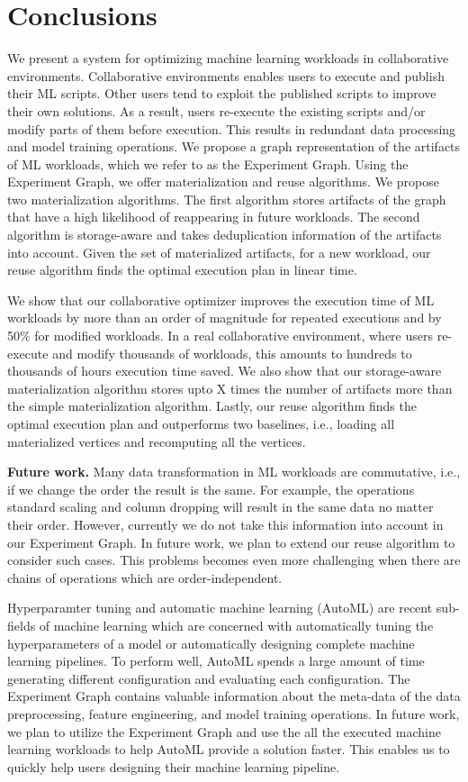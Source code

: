 \section{Conclusions} \label{sec-conclusion}
We present a system for optimizing machine learning workloads in collaborative environments.
Collaborative environments enables users to execute and publish their ML scripts.
Other users tend to exploit the published scripts to improve their own solutions.
As a result, users re-execute the existing scripts and/or modify parts of them before execution.
This results in redundant data processing and model training operations.
We propose a graph representation of the artifacts of ML workloads, which we refer to as the Experiment Graph.
Using the Experiment Graph, we offer materialization and reuse algorithms.
We propose two materialization algorithms.
The first algorithm stores artifacts of the graph that have a high likelihood of reappearing in future workloads.
The second algorithm is storage-aware and takes deduplication information of the artifacts into account.
Given the set of materialized artifacts, for a new workload, our reuse algorithm finds the optimal execution plan in linear time.

We show that our collaborative optimizer improves the execution time of ML workloads by more than an order of magnitude for repeated executions and by 50\% for modified workloads.
In a real collaborative environment, where users re-execute and modify thousands of workloads, this amounts to hundreds to thousands of hours execution time saved.
We also show that our storage-aware materialization algorithm stores upto X times the number of artifacts more than the simple materialization algorithm.
Lastly, our reuse algorithm finds the optimal execution plan and outperforms two baselines, i.e., loading all materialized vertices and recomputing all the vertices.

\textbf{Future work.}
Many data transformation in ML workloads are commutative, i.e., if we change the order the result is the same.
For example, the operations standard scaling and column dropping will result in the same data no matter their order.
However, currently we do not take this information into account in our Experiment Graph.
In future work, we plan to extend our reuse algorithm to consider such cases.
This problems becomes even more challenging when there are chains of operations which are order-independent.

Hyperparamter tuning and automatic machine learning (AutoML) are recent sub-fields of machine learning which are concerned with automatically tuning the hyperparameters of a model or automatically designing complete machine learning pipelines.
To perform well, AutoML spends a large amount of time generating different configuration and evaluating each configuration.
The Experiment Graph contains valuable information about the meta-data of the data preprocessing, feature engineering, and model training operations.
In future work, we plan to utilize the Experiment Graph and use the all the executed machine learning workloads to help AutoML provide a solution faster.
This enables us to quickly help users designing their machine learning pipeline.

